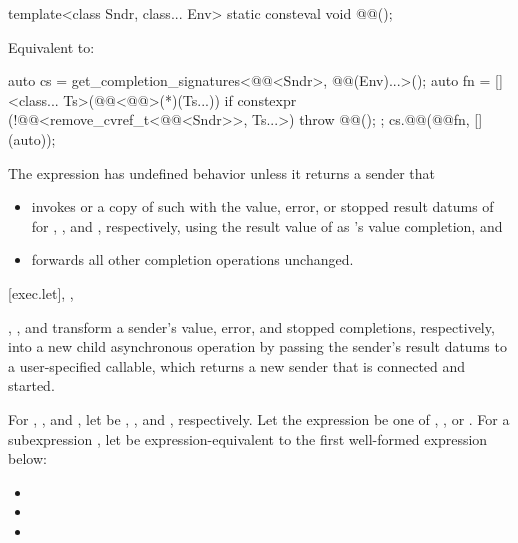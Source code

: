 \begin{itemdecl}
template<class Sndr, class... Env>
  static consteval void @@();
\end{itemdecl}

\begin{itemdescr}
\pnum
\effects
Equivalent to:
\begin{codeblock}
auto cs = get_completion_signatures<@@<Sndr>, @@(Env)...>();
auto fn = []<class... Ts>(@@<@@>(*)(Ts...)) {
  if constexpr (!@@<remove_cvref_t<@@<Sndr>>, Ts...>)
    throw @@();
};
cs.@@(@@{fn, [](auto){}});
\end{codeblock}
\end{itemdescr}

\pnum
The expression  has undefined behavior
unless it returns a sender  that
\begin{itemize}
\item
invokes  or a copy of such
with the value, error, or stopped result datums of 
for , , and , respectively,
using the result value of  as 's value completion, and
\item
forwards all other completion operations unchanged.
\end{itemize}

[exec.let]{, , }

\pnum
{}, , and  transform
a sender's value, error, and stopped completions, respectively,
into a new child asynchronous operation
by passing the sender's result datums to a user-specified callable,
which returns a new sender that is connected and started.

\pnum
For , , and ,
let  be
, , and , respectively.
Let the expression  be one of
, , or .
For a subexpression ,
let  be expression-equivalent to
the first well-formed expression below:
\begin{itemize}
\item
{}
\item
{}
\item
{}
\end{itemize}

